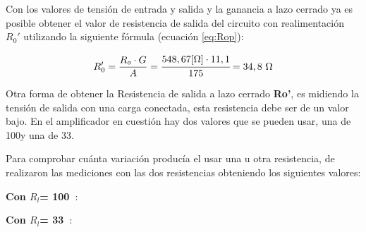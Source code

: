 \begin{table}[H]
    \centering
        \def\tablename{Tabla} 
        \caption{Valores medidos de tensión y ganancia calculada}
        \label{tab:exp5c}
\end{table}

Con los valores de tensión de entrada y salida y la ganancia a lazo cerrado ya es posible obtener el valor de resistencia de salida del circuito con realimentación \textbf{$R_0'$} utilizando la siguiente fórmula (ecuación \ref{eq:Rop}):

\begin{equation}
     R_0'= \frac{R_o \cdot G}{A}= \cfrac{548,67 [\ohm] \cdot 11,1}{175}= 34,8~\ohm
     \label{eq:Rop}
\end{equation}

Otra forma de  obtener la Resistencia de salida a lazo cerrado \textbf{Ro'}, es midiendo la tensión de salida con una carga conectada, esta resistencia debe ser de un valor bajo. En el amplificador en cuestión hay dos valores que se pueden usar, una de 100\ohm y una de 33\ohm. 

Para comprobar cuánta variación producía el usar una u otra resistencia, de realizaron las mediciones con las dos resistencias obteniendo los siguientes valores:

\vspace{0.5cm}
\textbf{Con $R_l$= 100~\ohm}:

\begin{table}[H]
    \centering
        \def\tablename{Tabla} 
        \caption{Valores de tensión medidos y resistencia calculada}
        \label{tab:exp5d}
\end{table}

\textbf{Con $R_l$= 33~\ohm}:

\begin{table}[H]
    \centering
        \def\tablename{Tabla} 
        \caption{Valores de tensión medidos y resistencia calculada}
        \label{tab:exp5e}
\end{table}

